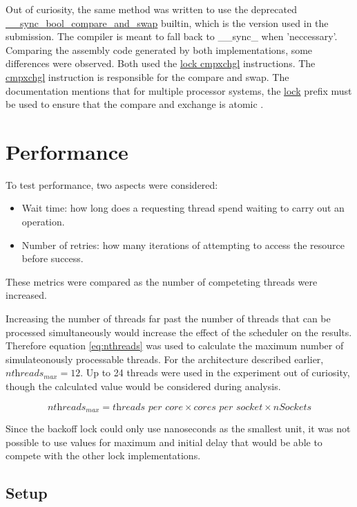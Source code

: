 \documentclass[12pt]{article}
\begin{document}
Out of curiosity, the same method was written to use the deprecated \url{__sync_bool_compare_and_swap} builtin, which is the version used in the submission. The compiler is meant to fall back to \_\_sync\_ when 'neccessary'. Comparing the assembly code generated by both implementations, some differences were observed. Both used the \url{lock cmpxchgl} instructions. The \url{cmpxchgl} instruction is responsible for the compare and swap. The documentation mentions that for multiple processor systems, the \url{lock} prefix must be used to ensure that the compare and exchange is atomic \cite{intelAtomic}.

\section{Performance}

To test performance, two aspects were considered:

\begin{itemize}
\item Wait time: how long does a requesting thread spend waiting to carry out an operation.
\item Number of retries: how many iterations of attempting to access the resource before success.
\end{itemize}

\noindent These metrics were compared as the number of competeting threads were increased.

Increasing the number of threads far past the number of threads that can be processed simultaneously would increase the effect of the scheduler on the results. Therefore equation \ref{eq:nthreads} was used to calculate the maximum number of simulateonously processable threads. For the architecture described earlier, $\textit{nthreads}_\textit{max} = 12 $. Up to 24 threads were used in the experiment out of curiosity, though the calculated value would be considered during analysis.

\begin{equation}
\label{eq:nthreads}
	\textit{nthreads}_\textit{max} =
	 \textit{threads per core} \times \textit{cores per socket} \times \textit{nSockets}
\end{equation}

Since the backoff lock could only use nanoseconds as the smallest unit, it was not possible to use values for maximum and initial delay that would be able to compete with the other lock implementations.

\subsection{Setup}
\end{document}
